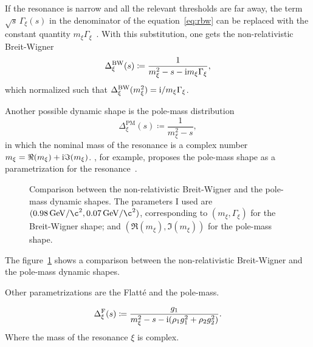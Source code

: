     If the resonance is narrow and all the relevant thresholds are far away, the term $\sqrt{s}\,\Gamma_\xi(s)$ in the denominator of the equation~\eqref{eq:rbw} can be replaced with the constant quantity $m_{\xi}\Gamma_{\xi}$~\cite[\S~47.2.1]{chinese_phisics}.
    With this substitution, one gets the non-relativistic Breit-Wigner
    \begin{equation}\label{eq:bw}
        \Delta_{\xi}^{\text{BW}}(s) \coloneqq \frac{1}{m_{\xi}^2 - s - \mathrm{i} m_{\xi} \Gamma_{\xi}},
    \end{equation}
    which normalized such that $\Delta_{\xi}^{\text{BW}}(m_{\xi}^2) = \mathrm{i} / m_\xi\Gamma_\xi$.


    Another possible dynamic shape is the pole-mass distribution
    \begin{equation}
        \Delta_{\xi}^{\text{PM}}(s) \coloneqq \frac{1}{m_{\xi}^2 - s},
    \end{equation}
    in which the nominal mass of the resonance is a complex number $m_\xi = \Re (m_\xi) + \mathrm{i}\Im(m_\xi)$.
    \citeauthor{PhysRevD.71.054030}, for example, proposes the pole-mass shape as a parametrization for the \Psigma{} resonance~\cite{PhysRevD.71.054030}.
    \begin{figure}
        \centering
        
        \caption{Comparison between the non-relativistic Breit-Wigner and the pole-mass dynamic shapes. The parameters I used are $(\SI{.98}{\giga\electronvolt/\c^2}, \SI{.07}{\giga\electronvolt/\c^2})$, corresponding to $(m_\xi,\Gamma_\xi)$ for the Breit-Wigner shape; and $(\Re(m_\xi),\Im(m_\xi))$ for the pole-mass shape.}

        \label{fig:bw_pm_comparison}
    \end{figure}
    The figure~\ref{fig:bw_pm_comparison} shows a comparison between the non-relativistic Breit-Wigner and the pole-mass dynamic shapes.

    {\color{red} Other parametrizations are the Flatté and the pole-mass.

    \begin{equation}
        \Delta_{\xi}^{\text{F}}(s) \coloneqq \frac{g_1}{m_{\xi}^2 - s - \mathrm{i}(\rho_1 g_1^2 + \rho_2 g_2^2)}.
    \end{equation}
    Where the mass of the resonance $\xi$ is complex.
    }

